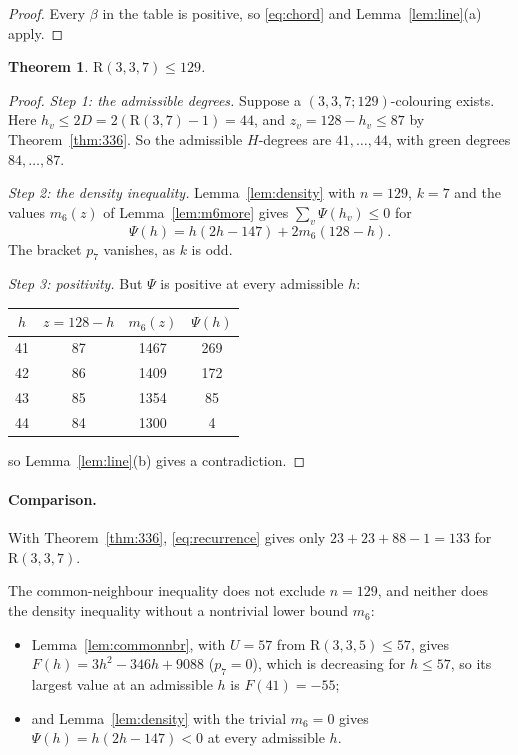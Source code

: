 \documentclass[11pt]{article}
\theoremstyle{spacedplain}
\newtheorem{theorem}{Theorem}[section]
\theoremstyle{spaceddef}
\theoremstyle{spacedremark}
\newcommand{\R}{\mathrm{R}}
\begin{document}
\begin{proof}
Every $\beta$ in the table is positive, so \eqref{eq:chord} and Lemma~\ref{lem:line}(a) apply.
\end{proof}

\begin{theorem}\label{thm:337}
$\R(3,3,7)\le 129$.
\end{theorem}

\begin{proof}
\emph{Step 1: the admissible degrees.}
Suppose a $(3,3,7;129)$-colouring exists.
Here $h_v\le 2D=2(\R(3,7)-1)=44$, and $z_v=128-h_v\le 87$ by Theorem~\ref{thm:336}.
So the admissible $H$-degrees are $41,\dots,44$, with green degrees $84,\dots,87$.

\emph{Step 2: the density inequality.}
Lemma~\ref{lem:density} with $n=129$, $k=7$ and the values $m_6(z)$ of Lemma~\ref{lem:m6more} gives $\sum_v\Psi(h_v)\le 0$ for
\[
\Psi(h)=h(2h-147)+2m_6(128-h).
\]
The bracket $p_7$ vanishes, as $k$ is odd.

\emph{Step 3: positivity.}
But $\Psi$ is positive at every admissible $h$:
\begin{center}
\begin{tabular}{cccc}
\toprule
$h$ & $z=128-h$ & $m_6(z)$ & $\Psi(h)$\\
\midrule
41&87&1467&269\\ 42&86&1409&172\\ 43&85&1354&85\\ 44&84&1300&4\\
\bottomrule
\end{tabular}
\end{center}
so Lemma~\ref{lem:line}(b) gives a contradiction.
\end{proof}

\paragraph{Comparison.}
With Theorem~\ref{thm:336}, \eqref{eq:recurrence} gives only $23+23+88-1=133$ for $\R(3,3,7)$.

The common-neighbour inequality does not exclude $n=129$, and neither does the density inequality without a nontrivial lower bound $m_6$:
\begin{itemize}
\item Lemma~\ref{lem:commonnbr}, with $U=57$ from $\R(3,3,5)\le 57$, gives $F(h)=3h^2-346h+9088$ ($p_7=0$), which is decreasing for $h\le 57$, so its largest value at an admissible $h$ is $F(41)=-55$;
\item and Lemma~\ref{lem:density} with the trivial $m_6=0$ gives $\Psi(h)=h(2h-147)<0$ at every admissible $h$.
\end{itemize}
\end{document}
